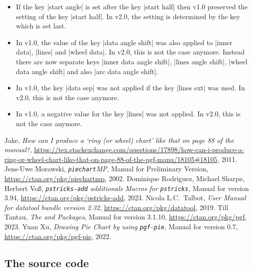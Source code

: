\documentclass[a4paper,english,dvipsnames]{ltxdoc}
\begin{document}
\begin{itemize}
\begin{itemize}
\item If the key |start angle| is set after the key |start half| then v1.0 preserved the setting of the key |start half|. In v2.0, the setting is determined by the key which is set last.
\item In v1.0, the value of the key |data angle shift| was also applied to |inner data|, |lines| and |wheel data|. In v2.0, this is not the case anymore. Instead there are now separate keys |inner data angle shift|, |lines angle shift|, |wheel data angle shift| and also |arc data angle shift|.
\item In v1.0, the key |data sep| was not applied if the key |lines ext| was used. In v2.0, this is not the case anymore.
\item In v1.0, a negative value for the key |lines| was not applied. In v2.0, this is not the case anymore.
\end{itemize}
\end{itemize}
\begin{thebibliography}{9}
Jake,
\emph{How can I produce a `ring (or wheel) chart' like that on page 88 of the {\upshape\pgfname} manual?},
\url{https://tex.stackexchange.com/questions/17898/how-can-i-produce-a-ring-or-wheel-chart-like-that-on-page-88-of-the-pgf-manu/18105#18105},
2011.
Jens-Uwe Morawski,
\emph{{\upshape\texttt{piechart}\textsf{MP}}},
Manual for Preliminary Version,
\url{https://ctan.org/pkg/piechartmp},
2002.
Dominique Rodriguez, Michael Sharpe, Herbert Vo{\ss},
\emph{{\upshape\texttt{pstricks-add} \textsf{additionals Macros for} \texttt{pstricks}}},
Manual for version 3.94,
\url{https://ctan.org/pkg/pstricks-add},
2023.
Nicola L.C.~Talbot,
\emph{User Manual for datatool bundle version 2.32},
\url{https://ctan.org/pkg/datatool},
2019.
Till Tantau,
\emph{The \tikzname{} and {\upshape\pgfname} Packages},
Manual for version 3.1.10,
\url{https://ctan.org/pkg/pgf},
2023.
Yuan Xu,
\emph{Drawing Pie Chart by using {\upshape\texttt{pgf-pie}}},
Manual for version 0.7,
\url{https://ctan.org/pkg/pgf-pie},
2022.
\end{thebibliography}
\printindex
{}
\pagestyle{plain}
\appendix
{}
\begin{landscape}
\section{The source code}\label{Thesourcecode}
\end{landscape}
\end{document}
